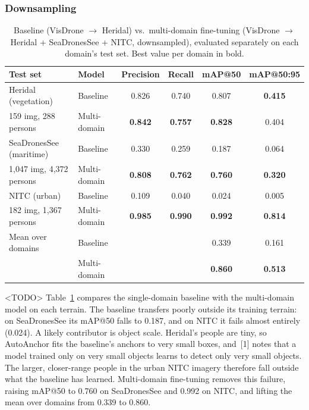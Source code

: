 \documentclass{article}
\begin{document}
\subsubsection{Downsampling}
\begin{table}[h]
  \caption{Baseline (VisDrone $\rightarrow$ Heridal) vs.\ multi-domain fine-tuning (VisDrone $\rightarrow$ Heridal + SeaDronesSee + NITC, downsampled), evaluated separately on each domain's test set. Best value per domain in bold.}
  \label{tab:multidomain}
  \centering
  \small
  \begin{tabular}{llcccc}
    \toprule
    Test set & Model & Precision & Recall & mAP@50 & mAP@50:95 \\
    \midrule
    Heridal (vegetation) & Baseline & 0.826 & 0.740 & 0.807 & \textbf{0.415} \\
    {\footnotesize 159 img, 288 persons} & Multi-domain & \textbf{0.842} & \textbf{0.757} & \textbf{0.828} & 0.404 \\
    \midrule
    SeaDronesSee (maritime) & Baseline & 0.330 & 0.259 & 0.187 & 0.064 \\
    {\footnotesize 1,047 img, 4,372 persons} & Multi-domain & \textbf{0.808} & \textbf{0.762} & \textbf{0.760} & \textbf{0.320} \\
    \midrule
    NITC (urban) & Baseline & 0.109 & 0.040 & 0.024 & 0.005 \\
    {\footnotesize 182 img, 1,367 persons} & Multi-domain & \textbf{0.985} & \textbf{0.990} & \textbf{0.992} & \textbf{0.814} \\
    \midrule
    Mean over domains & Baseline & & & 0.339 & 0.161 \\
     & Multi-domain & & & \textbf{0.860} & \textbf{0.513} \\
    \bottomrule
  \end{tabular}
\end{table}

<TODO> 
Table~\ref{tab:multidomain} compares the single-domain baseline with the multi-domain model on each terrain. The baseline transfers poorly outside its training terrain: on SeaDronesSee its mAP@50 falls to 0.187, and on NITC it fails almost entirely (0.024). A likely contributor is object scale. Heridal's people are tiny, so AutoAnchor fits the baseline's anchors to very small boxes, and~[1] notes that a model trained only on very small objects learns to detect only very small objects. The larger, closer-range people in the urban NITC imagery therefore fall outside what the baseline has learned. Multi-domain fine-tuning removes this failure, raising mAP@50 to 0.760 on SeaDronesSee and 0.992 on NITC, and lifting the mean over domains from 0.339 to 0.860.
\end{document}
